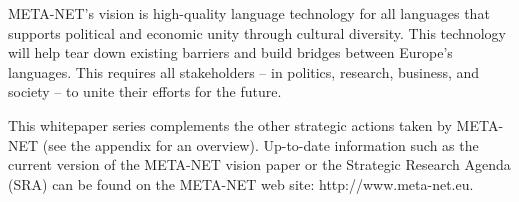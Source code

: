 \begin{multicols}{2}
META-NET’s vision is high-quality language technology for all languages that supports political and economic unity through cultural diversity. This technology will help tear down existing barriers and build bridges between Europe’s languages. This requires all stakeholders -- in politics, research, business, and society -- to unite their efforts for the future.

This whitepaper series complements the other strategic actions taken by META-NET (see the appendix for an overview). Up-to-date information such as the current version of the META-NET vision paper \cite{Meta1} or the Strategic Research Agenda (SRA) can be found on the META-NET web site: http://www.meta-net.eu.
\end{multicols}

\clearpage


